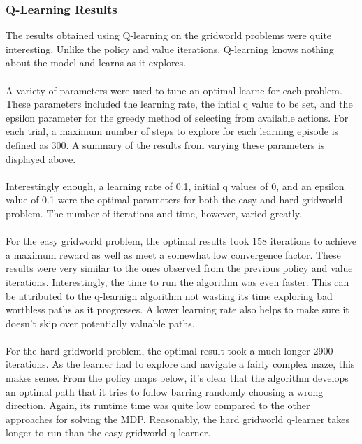 \documentclass[h]{article}
\begin{document}
 \subsubsection*{Q-Learning Results}
 The results obtained using Q-learning on the gridworld problems were quite 
 interesting.  Unlike the policy and value iterations, Q-learning knows nothing 
 about the model and learns as it explores.  
 \\ \\ 
 A variety of parameters were 
 used to tune an optimal learne for each problem.  These parameters included the
 learning rate, the intial q value to be set, and the epsilon 
 parameter for the greedy method of selecting from available actions.  For each 
 trial, a maximum number of steps to explore for each learning episode is defined as 300.  
 A summary of the results from varying these parameters is displayed above.
 \\ \\
 Interestingly enough, a learning rate of 0.1, initial q values of 0, and an 
 epsilon value of 0.1 were the optimal parameters for both the easy and hard 
 gridworld problem.  The number of iterations and time, however, varied greatly.
 \\ \\
 For the easy gridworld problem, the optimal results took 158 iterations to 
 achieve a maximum reward as well as meet a somewhat low convergence factor.  
 These results were very similar to the ones observed from the previous policy and 
 value iterations.  Interestingly, the time to run the algorithm was even 
 faster.  This can be attributed to the q-learnign algorithm not wasting its 
 time exploring bad worthless paths as it progresses.  A lower learning rate 
 also helps to make sure it doesn't skip over potentially valuable paths.
 \\ \\
 For the hard gridworld problem, the optimal result took a much longer 2900 
 iterations.  As the learner had to explore and navigate a fairly complex maze, 
 this makes sense.  From the policy maps below, it's clear that the algorithm 
 develops an optimal path that it tries to follow barring randomly choosing a 
 wrong direction.  Again, its runtime time was quite low compared to the other 
 approaches for solving the MDP.  Reasonably, the hard gridworld q-learner takes 
 longer to run than the easy gridworld q-learner. 
\end{document}

